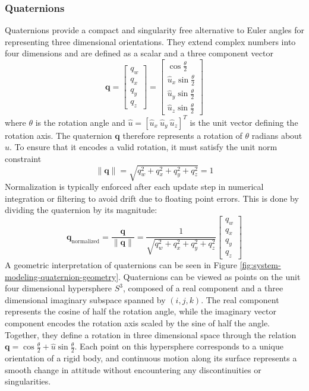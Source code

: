 \subsubsection{Quaternions}
Quaternions provide a compact and singularity free alternative to Euler angles for representing three dimensional orientations. They extend complex numbers into four dimensions and are defined as a scalar and a three component vector
$$
    \mathbf{q} =
    \begin{bmatrix}
        q_w \\ q_x \\ q_y \\ q_z
    \end{bmatrix}
    =
    \begin{bmatrix}
        \cos\frac{\theta}{2} \\
        \hat{u}_x \sin\frac{\theta}{2} \\
        \hat{u}_y \sin\frac{\theta}{2} \\
        \hat{u}_z \sin\frac{\theta}{2}
    \end{bmatrix}
$$
where $\theta$ is the rotation angle and $\hat{u} = [\hat{u}_x~\hat{u}_y~\hat{u}_z]^T$ is the unit vector defining the rotation axis. The quaternion $\mathbf{q}$ therefore represents a rotation of $\theta$ radians about $\hat{u}$. To ensure that it encodes a valid rotation, it must satisfy the unit norm constraint
$$
    \|\mathbf{q}\| = \sqrt{q_w^2 + q_x^2 + q_y^2 + q_z^2} = 1
$$
Normalization is typically enforced after each update step in numerical integration or filtering to avoid drift due to floating point errors. This is done by dividing the quaternion by its magnitude:
$$
    \mathbf{q}_{\text{normalized}} = \frac{\mathbf{q}}{\|\mathbf{q}\|} = 
    \frac{1}{\sqrt{q_w^2 + q_x^2 + q_y^2 + q_z^2}}
    \begin{bmatrix}
        q_w \\ q_x \\ q_y \\ q_z
    \end{bmatrix}
$$
A geometric interpretation of quaternions can be seen in Figure \ref{fig:system-modeling-quaternion-geometry}. Quaternions can be viewed as points on the unit four dimensional hypersphere $S^3$, composed of a real component and a three dimensional imaginary subspace spanned by $(i, j, k)$. The real component represents the cosine of half the rotation angle, while the imaginary vector component encodes the rotation axis scaled by the sine of half the angle. Together, they define a rotation in three dimensional space through the relation $\mathbf{q} = \cos\frac{\theta}{2} + \hat{u}\sin\frac{\theta}{2}$. Each point on this hypersphere corresponds to a unique orientation of a rigid body, and continuous motion along its surface represents a smooth change in attitude without encountering any discontinuities or singularities.  
